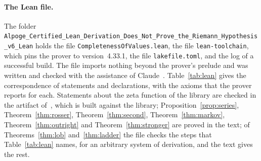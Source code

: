 \documentclass[11pt]{article}
\theoremstyle{definition}
\theoremstyle{remark}
\begin{document}
\paragraph{The Lean file.} The folder \nolinkurl{Alpoge_Certified_Lean_Derivation_Does_Not_Prove_the_Riemann_Hypothesis_v6_Lean} holds the file \nolinkurl{CompletenessOfValues.lean}, the file \nolinkurl{lean-toolchain}, which pins the prover to version~4.33.1, the file \nolinkurl{lakefile.toml}, and the log of a successful build. The file imports nothing beyond the prover's prelude and was written and checked with the assistance of Claude~\citep{claude}. Table~\ref{tab:lean} gives the correspondence of statements and declarations, with the axioms that the prover reports for each. Statements about the zeta function of the library are checked in the artifact of~\citet{tv}, which is built against the library; Proposition~\ref{prop:series}, Theorem~\ref{thm:rosser}, Theorem~\ref{thm:second}, Theorem~\ref{thm:markov}, Theorem~\ref{thm:outright} and Theorem~\ref{thm:stronger} are proved in the text; of Theorems~\ref{thm:lob} and~\ref{thm:ladder} the file checks the steps that Table~\ref{tab:lean} names, for an arbitrary system of derivation, and the text gives the rest.
\end{document}
